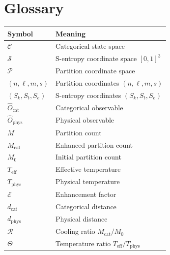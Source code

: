 \documentclass[twocolumn,10pt,twoside]{article}
\newcommand{\Cat}{\mathcal{C}}
\newcommand{\Sent}{\mathcal{S}}
\newcommand{\Part}{\mathcal{P}}
\newcommand{\Enh}{\mathcal{E}}
\newcommand{\Ocat}{\hat{O}_{\mathrm{cat}}}
\newcommand{\Ophys}{\hat{O}_{\mathrm{phys}}}
\newcommand{\Teff}{T_{\mathrm{eff}}}
\newcommand{\Tphys}{T_{\mathrm{phys}}}
\newcommand{\Mcat}{M_{\mathrm{cat}}}
\newcommand{\dcat}{d_{\mathrm{cat}}}
\newcommand{\dphys}{d_{\mathrm{phys}}}
\newcommand{\partcoord}{(n,\ell,m,s)}
\newcommand{\sentcoord}{(S_k,S_t,S_e)}
\begin{document}
\section{Glossary}

\begin{center}
\begin{tabular}{ll}
\toprule
\textbf{Symbol} & \textbf{Meaning} \\
\midrule
$\Cat$ & Categorical state space \\
$\Sent$ & S-entropy coordinate space $[0,1]^3$ \\
$\Part$ & Partition coordinate space \\
$\partcoord$ & Partition coordinates $(n, \ell, m, s)$ \\
$\sentcoord$ & S-entropy coordinates $(S_k, S_t, S_e)$ \\
$\Ocat$ & Categorical observable \\
$\Ophys$ & Physical observable \\
$M$ & Partition count \\
$\Mcat$ & Enhanced partition count \\
$M_0$ & Initial partition count \\
$\Teff$ & Effective temperature \\
$\Tphys$ & Physical temperature \\
$\Enh$ & Enhancement factor \\
$\dcat$ & Categorical distance \\
$\dphys$ & Physical distance \\
$\mathcal{R}$ & Cooling ratio $\Mcat/M_0$ \\
$\Theta$ & Temperature ratio $\Teff/\Tphys$ \\
\bottomrule
\end{tabular}
\end{center}



\end{document}
